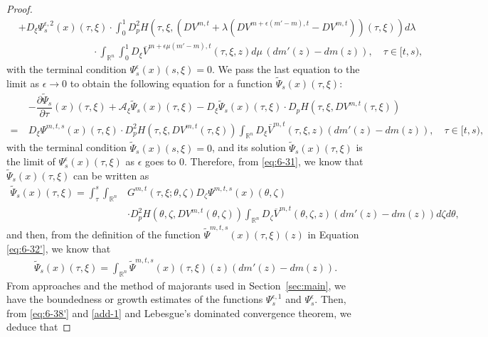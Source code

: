 \documentclass[11pt]{article}
\numberwithin{equation}{section}
\newcommand{\brn}{{\mathbb{R}^n}}
\newcommand{\1}{\mbox{1\hspace{-1mm}I}}
\begin{document}
\begin{proof}
\begin{align*}
    &+ D_{\xi}\Psi_{s}^{\epsilon,2}(x)(\tau,\xi)\cdot \int_{0}^{1}D_{p}^{2}H\left(\tau,\xi, \left(DV^{m,t}+\lambda(DV^{m+\epsilon(m'-m),t}-DV^{m,t})\right)(\tau,\xi) \right) d\lambda \\
    &\ \ \quad\qquad\qquad\qquad \cdot \int_{\brn}\int_{0}^{1} D_\xi\overline{V}^{m+\epsilon\mu(m'-m),t}(\tau,\xi,z)d\mu\,(dm'(z)-dm(z)),\quad \tau\in[t,s),
\end{align*}
with the terminal condition $\Psi_{s}^{\epsilon}(x)(s,\xi)=0$.  We pass the last equation to the limit as $\epsilon\rightarrow0$ to obtain the following equation for a function $\widetilde{\Psi}_s(x)(\tau,\xi)$: 
\begin{align*}
    &-\dfrac{\partial \widetilde{\Psi}_s}{\partial\tau}(x)(\tau,\xi)+\mathcal{A}_{\xi}\widetilde{\Psi}_s(x)(\tau,\xi) - D_{\xi}\widetilde{\Psi}_s(x)(\tau,\xi)\cdot D_p H \left(\tau,\xi,DV^{m,t}(\tau,\xi) \right)\\
    =\ & D_{\xi}\Psi^{m,t,s}(x)(\tau,\xi)\cdot  D_{p}^{2}H\left(\tau,\xi, DV^{m,t}(\tau,\xi) \right)  \int_{\brn} D_\xi\overline{V}^{m,t}(\tau,\xi,z)(dm'(z)-dm(z)),\quad \tau\in[t,s),
\end{align*}
with the terminal condition $\widetilde{\Psi}_s(x)(s,\xi)=0$, and its solution $\widetilde{\Psi}_s(x)(\tau,\xi)$ is the limit of $\Psi_{s}^{\epsilon}(x)(\tau,\xi)$ as $\epsilon$ goes to $0$. Therefore, from \eqref{eq:6-31}, we know that $\widetilde{\Psi}_s(x)(\tau,\xi)$ can be written as
\begin{equation*}\label{eq:6-48}
\begin{aligned}
    \widetilde{\Psi}_{s}(x)(\tau,\xi)=\int_{\tau}^{s} \int_\brn &G^{m,t}(\tau,\xi;\theta,\zeta)D_{\zeta}\Psi^{m,t,s}(x)(\theta,\zeta) \\
    &\cdot D_{p}^{2}H\left(\theta,\zeta,DV^{m,t}(\theta,\zeta)\right)\int_{\brn}D_{\zeta}\overline{V}^{m,t}(\theta,\zeta,z)(dm'(z)-dm(z)) d\zeta d\theta,
\end{aligned}
\end{equation*}
and then, from the definition of the function $\widetilde{\Psi}^{m,t,s}(x)(\tau,\xi)(z)$ in Equation \eqref{eq:6-32'}, we know that 
\begin{align}\label{add-1}
    \widetilde{\Psi}_{s}(x)(\tau,\xi)=\int_{\brn}\widetilde{\Psi}^{m,t,s}(x)(\tau,\xi)(z)(dm'(z)-dm(z)).
\end{align}
From approaches and the method of majorants used in Section~\ref{sec:main}, we have the boundedness or growth estimates of the functions $\Psi_{s}^{\epsilon,1}$ and $\Psi_{s}^{\epsilon}$. Then, from \eqref{eq:6-38'} and \eqref{add-1} and Lebesgue's dominated convergence theorem, we deduce that

\end{proof}
\end{document}

